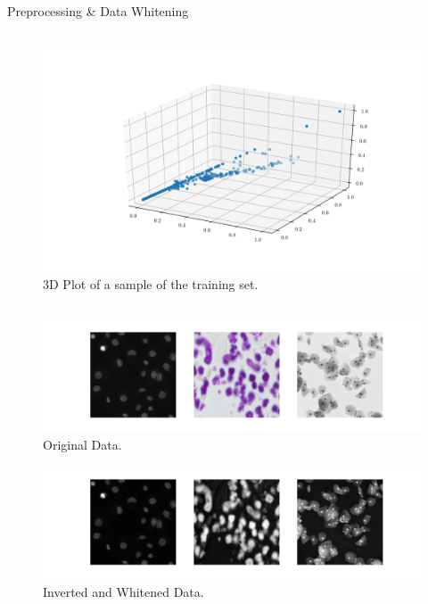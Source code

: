 \documentclass[final]{beamer}
\newlength{\onecolwid}
\begin{document}
\begin{frame}[t]
\begin{columns}[t]
\begin{column}{\onecolwid}
\begin{block}{Preprocessing \& Data Whitening}
\begin{columns}[c]
            \begin{figure}
                \centering
                \caption{3D Plot of a sample of the training set.}
                \label{fig:correlated-features}
                \includegraphics[width=\textwidth]{../paper/figs/correlated-features.png}
            \end{figure}
        \end{columns}

        \begin{figure}
            \centering
            \caption{Original Data.}
            \label{fig:correlated-features}
            \includegraphics[width=\textwidth]{./figs/dsbowl18-imagegrid-1x3.png}
        \end{figure}

        \begin{figure}
            \centering
            \caption{Inverted and Whitened Data.}
            \label{fig:correlated-features}
            \includegraphics[width=\textwidth]{./figs/dsbowl18-imagegrid-1x3-whitened.png}
        \end{figure}


\end{block}
\end{column}
\end{columns}
\end{frame}
\end{document}
